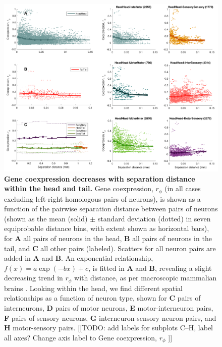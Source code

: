 \documentclass[10pt,letterpaper]{article}
\begin{document}
\begin{figure}[h]
\centering
    \includegraphics[width=1\textwidth]{DistanceCoexpression.pdf}
\caption{
\label{fig:S_distCoexp}
\textbf{Gene coexpression decreases with separation distance within the head and tail.}
Gene coexpression, $r_\phi$ (in all cases excluding left-right homologous pairs of neurons), is shown as a function of the pairwise separation distance between pairs of neurons (shown as the mean (solid) $\pm$ standard deviation (dotted) in seven equiprobable distance bins, with extent shown as horizontal bars), for \textbf{A} all pairs of neurons in the head, \textbf{B} all pairs of neurons in the tail, and \textbf{C} all other pairs (labeled).
Scatters for all neuron pairs are added in \textbf{A} and \textbf{B}.
An exponential relationship, $f(x) = a\exp(-bx) + c$, is fitted in \textbf{A} and \textbf{B}, revealing a slight decreasing trend in $r_\phi$ with distance, as per macroscopic mammalian brains \cite{Fulcher:2016ck, Krienen:2016eq}.
Looking within the head, we find different spatial relationships as a function of neuron type, shown for \textbf{C} pairs of interneurons, \textbf{D} pairs of motor neurons, \textbf{E} motor-interneuron pairs, \textbf{F} pairs of sensory neurons, \textbf{G} interneuron-sensory neuron pairs, and \textbf{H} motor-sensory pairs.
[[TODO: add labels for subplots C--H, label all axes? Change axis label to Gene coexpression, $r_\phi$ ]]
}
\end{figure}
\end{document}
